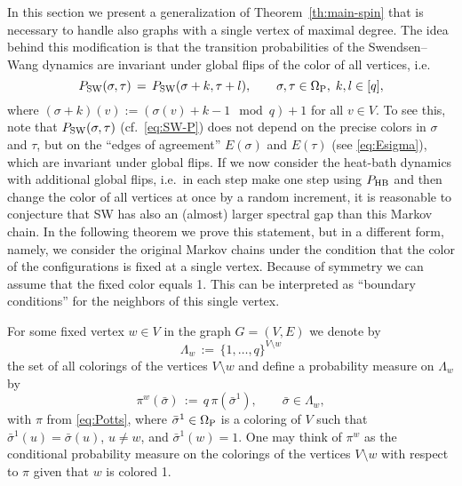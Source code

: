 \documentclass{dis}
\theoremstyle{citing}
\begin{document}
In this section we present a generalization of 
Theorem~\ref{th:main-spin} 
that is necessary to handle also graphs with a single 
vertex of maximal degree.
The idea behind this modification is that the transition 
probabilities of the Swendsen--Wang dynamics are invariant 
under global flips of the color of all vertices, i.e. 
\begin{equation}\label{eq:SW-flip}
{P_{\rm SW}}(\sigma,\tau) \,=\, {P_{\rm SW}}(\sigma+k,\tau+l),
\qquad\sigma,\tau\in{{\Omega}_{\rm P}},\; k,l\in[q], 
\end{equation}
where 
$(\sigma+k)(v):=(\sigma(v)+k-1\mod q)+1$ for all $v\in V$.
To see this, note that ${P_{\rm SW}}(\sigma,\tau)$ (cf.~\eqref{eq:SW-P}) 
does not depend on the precise colors in $\sigma$ and $\tau$, 
but on the ``edges of agreement'' $E(\sigma)$ and $E(\tau)$ 
(see \eqref{eq:Esigma}), 
which are invariant under global flips.
If we now consider the heat-bath dynamics with additional 
global flips, i.e.~in each step make one step using ${P_{\rm HB}}$ and 
then change the color of all vertices at once by a random 
increment, it is reasonable to conjecture that SW has also 
an (almost) larger spectral gap than this Markov chain.
In the following theorem we prove this statement, but 
in a different form, namely, we consider the original 
Markov chains under the condition that the color of the 
configurations is fixed at a single vertex. 
Because of symmetry we can assume that the fixed color equals 1.
This can be interpreted as ``boundary conditions'' for the 
neighbors of this single vertex.

For some fixed vertex $w\in V$ in the graph $G=(V,E)$ 
we denote by 
\[
\Lambda_w \,:=\, \bigl\{1,\dots,q\bigr\}^{V\setminus w}
\]
the set of all colorings of the vertices $V\setminus w$ 
and define a probability measure on $\Lambda_w$ by 
\begin{equation} \label{eq:Potts_w}
\pi^w(\bar\sigma) \,:=\, 
q\,\pi(\bar\sigma^1), 
\qquad \bar\sigma\in\Lambda_w, 
\end{equation}
with $\pi$ from \eqref{eq:Potts}, 
where $\bar\sigma^1\in{{\Omega}_{\rm P}}$ is a coloring of $V$ such that 
$\bar\sigma^1(u)=\bar\sigma(u)$, $u\neq w$, and 
$\bar\sigma^1(w)=1$. 
One may think of $\pi^w$ as the conditional probability measure 
on the colorings of the vertices $V\setminus w$ with respect to 
$\pi$ given that $w$ is colored 1.
\end{document}
